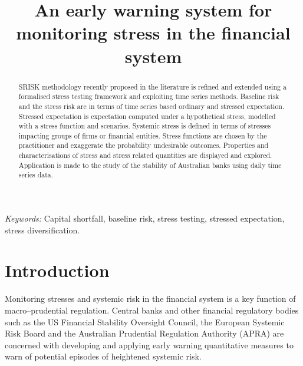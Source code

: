 \documentclass[authoryear]{elsarticle}
\begin{document}
\title{An early warning system for monitoring  stress in the financial system}


\begin{abstract}
SRISK methodology recently proposed in the literature is refined and extended using a formalised stress testing framework and exploiting time series methods.  Baseline risk and the stress risk  are in terms of time series based ordinary and stressed expectation.  Stressed expectation is expectation computed  under a hypothetical  stress, modelled with a stress function and scenarios.  Systemic stress is defined in terms of stresses   impacting groups of firms or financial entities.  Stress functions are chosen by the practitioner and  exaggerate the probability undesirable  outcomes.    Properties and characterisations of stress and stress related quantities are displayed and explored.     Application is made to the study of the stability of Australian banks using daily time series data.
\end{abstract}

\date{}
\maketitle
\noindent
{\it Keywords:}  Capital shortfall, baseline risk, stress testing,  stressed expectation, stress diversification.


\newpage

\section{Introduction}\label{intro}
Monitoring stresses and systemic risk in the financial system is a key function of macro--prudential regulation. Central banks and other financial regulatory bodies such as the US Financial Stability Oversight Council, the European Systemic Risk Board and the Australian Prudential Regulation Authority (APRA) are concerned with developing and applying early warning quantitative  measures  to warn of potential episodes of heightened systemic risk. 
\end{document}
